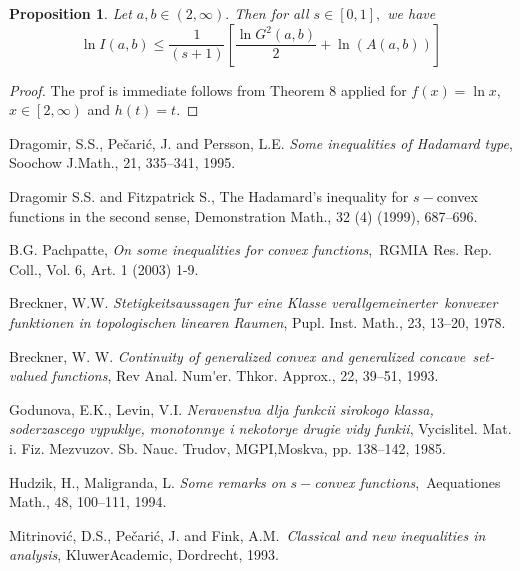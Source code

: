 \documentclass{amsart}
\theoremstyle{plain}
\newtheorem{proposition}{Proposition}
\numberwithin{equation}{section}
\begin{document}
\begin{proposition}
Let $a,b\in \left( 2,\infty \right) .$ Then for all $s\in \left[ 0,1\right]
, $ we have\begin{equation}
\ln I\left( a,b\right) \leq \frac{1}{\left( s+1\right) }\left[ \frac{\ln
G^{2}\left( a,b\right) }{2}+\ln \left( A(a,b)\right) \right]  \tag{3.3}
\end{equation}
\end{proposition}

\begin{proof}
The prof is immediate follows from Theorem 8 applied for $f\left( x\right)
=\ln x,$ $x\in \left[ 2,\infty \right) $ and $h\left( t\right) =t.$
\end{proof}

\begin{thebibliography}{99}
 \label{dr1}Dragomir, S.S., Pe\v{c}ari\'{c}, J. and Persson,
L.E. \textit{Some inequalities of Hadamard type}, Soochow J.Math., 21,
335--341, 1995.

 \label{ssd6}Dragomir S.S. and Fitzpatrick S., The Hadamard's
inequality for $s-$convex functions in the second sense, Demonstration
Math., 32 (4) (1999), 687--696.

 \label{pachpatte}B.G. Pachpatte, \textit{On some inequalities
for convex functions},\ RGMIA Res. Rep. Coll., Vol. 6, Art. 1 (2003) 1-9.

 \label{bre1}Breckner, W.W. \textit{Stetigkeitsaussagen f\"{}ur eine Klasse verallgemeinerter\ konvexer funktionen in topologischen
linearen Raumen}, Pupl. Inst. Math., 23, 13--20, 1978.

 \label{bre2}Breckner, W. W. \textit{Continuity of generalized
convex and generalized concave\ set-valued functions}, Rev Anal. Num\'{}er. Thkor. Approx., 22, 39--51, 1993.

 \label{god}Godunova, E.K., Levin, V.I. \textit{Neravenstva
dlja funkcii sirokogo klassa, soderzascego vypuklye, monotonnye i nekotorye
drugie vidy funkii}, Vycislitel. Mat. i. Fiz. Mezvuzov. Sb. Nauc. Trudov,
MGPI,Moskva, pp. 138--142, 1985.

 \label{hud}Hudzik, H., Maligranda, L. \textit{Some remarks on }$s-$\textit{convex functions},\ Aequationes Math., 48, 100--111, 1994.

 \label{mit2}Mitrinovi\'{c}, D.S., Pe\v{c}ari\'{c}, J. and
Fink, A.M.\ \textit{Classical and new inequalities in analysis},
KluwerAcademic, Dordrecht, 1993.


\end{thebibliography}
\end{document}
